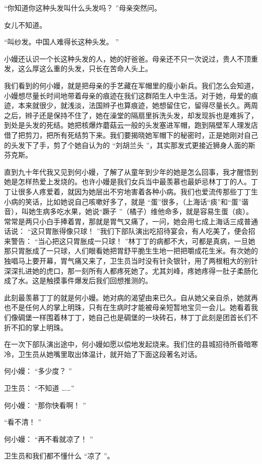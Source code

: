 \documentclass[12pt,twoside,openany]{book}
\begin{document}
“你知道你这种头发叫什么头发吗？ ”母亲突然问。

女儿不知道。

“叫纱发。中国人难得长这种头发。 ”

小嫚还认识一个长这种头发的人，她的好爸爸。母亲还不只一次说过，贵人不顶重发，这么厚这么重的头发，只长在苦命人头上。

我们看到的何小嫚，就是把母亲的手艺藏在军帽里的瘦小新兵。我们怎么会知道，小嫚想尽量长时间地带着母亲的痕迹在我们这群陌生人中生活。对于她，母爱的痕迹，本来就很少，就浅淡，法国辫子也算痕迹，她想留住它，留得尽量长久。两周之后，辫子还是保持不住了，她在澡堂的隔扇里拆洗头发，却发现拆也是难拆了，到处是头发的死结。她把核爆炸蘑菇云一般的头发塞进军帽，跑到隔壁军人理发店借了把剪刀，把所有死结剪下来。我们要揭晓她军帽下的秘密时，正是她刚对自己的头发下了手，剪了个她自认为的 “刘胡兰头 ”，其实那发式更接近狮身人面的斯芬克斯。

直到九十年代我又见到何小嫚，了解了从童年到少年的她是怎么回事，我才醒悟到她是怎样热爱上发烧的。也许小嫚是我们女兵当中最羡慕也最妒忌林丁丁的人。丁丁让很多人疼爱着，就因为她层出不穷地害着各种小病。我们也爱流传那些丁丁生小病的笑话，比如她说自己咳嗽好多了，就是 “蛋”很多，（上海话“痰”和“蛋”谐音），叫她生病多吃水果，她说“蹶子 ”（橘子）维他命多，就是容易生蛋（痰）。常常是两只小白手捧着胃，那就是胃气又痛了，一问，她会用七成上海话三成普通话说： “这只胃胀得像只球！ ”我们下部队演出吃招待宴会，有人吃美了，便会招来警告： “当心把这只胃胀成一只球！ ”林丁丁的病都不大，可都是真病，一旦她那只胃胀成了一只球，人们眼看她把胃舒平脆生生地一把把嚼成花生米。有次她的独唱马上要开幕，胃气痛又来了，卫生员当时没有针灸银针，用了两根粗大的别针深深扎进她的虎口，那一刻所有人都疼死她了。尤其刘峰，疼她疼得一肚子柔肠化成了水。这是触摸事件爆发后我们回想推测的。

此刻最羡慕丁丁的就是何小嫚。她对病的渴望由来已久。自从她父亲自杀，她就再也不是任何人的掌上明珠，只有在生病时才能被母亲短暂地宝贝一会儿。她看着我们像碉堡一样围着林丁丁，她自己也是碉堡的一块砖石，林丁丁此刻是团首长们不折不扣的掌上明珠。

在一次下部队演出途中，何小嫚如愿以偿地发起烧来。我们住的县城招待所昏暗寒冷，卫生员从她嘴里取出体温计，就开始了下面这段著名对话。

何小嫚： “多少度？ ”

卫生员： “不知道 ……”

何小嫚： “那你快看啊！ ”

“看不清！ ”

何小嫚： “再不看就凉了！ ”

卫生员和我们都不懂什么 “凉了 ”。
\end{document}
